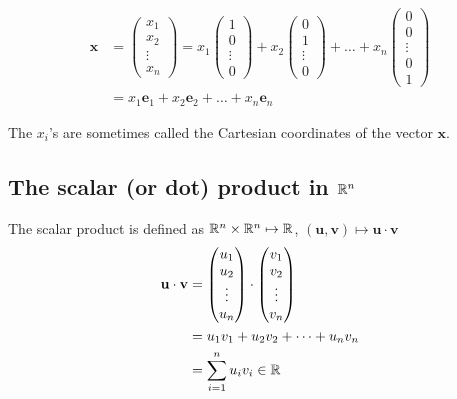 \documentclass[10pt, a4paper]{article}
\newcommand{\mbf}[1]{\mathbf{#1}}
\begin{document}
\begin{example}
    \begin{align*}
    \mbf{x} &= \begin{pmatrix}
        x_1 \\
        x_2 \\
        \vdots \\
        x_n
    \end{pmatrix}
    =
    x_1 \begin{pmatrix}
        1 \\
        0 \\
        \vdots \\
        0
    \end{pmatrix}
    +
    x_2 \begin{pmatrix}
        0 \\
        1 \\
        \vdots \\
        0
    \end{pmatrix}
    +
    \dots
    +
    x_n \begin{pmatrix}
        0 \\
        0 \\
        \vdots \\
        0 \\
        1
    \end{pmatrix} \\
    &= x_1 \mbf{e}_1 + x_2 \mbf{e}_2 + \dots + x_n \mbf{e}_n
    \end{align*}
\end{example}
The $x_i$'s are sometimes called the Cartesian coordinates of the vector $\mbf{x}$.

\subsection{The scalar (or dot) product in \texorpdfstring{$\mathbb{R} ^ n$}{}}

\begin{definition}
    The scalar product is defined as $\mathbb{R} ^ n \times \mathbb{R} ^ n \mapsto \mathbb{R}$, $(\mbf{u, v}) \mapsto \mbf{u \cdot v}$
    \begin{align*}
    \mbf{u \cdot v} &= \begin{pmatrix}
        u_1 \\
        u_2 \\
        \vdots \\
        u_n
    \end{pmatrix} \cdot
    \begin{pmatrix}
        v_1 \\
        v_2 \\
        \vdots \\
        v_n
    \end{pmatrix} \\
    &= u_1 v_1 + u_2 v_2 + \dots + u_n v_n  \\
    &= \sum_{i = 1}^{n}u_iv_i \in \R
    \end{align*}
\end{definition}
\end{document}
